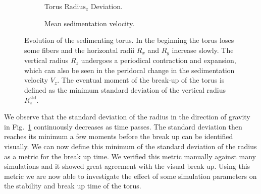 \begin{figure}[!htbp]
\begin{subfigure}[h]{.48\textwidth}
    \caption{Torus $\text{Radius}_z$ Deviation.}\label{fig:torus_deviation}
  \end{subfigure}
  \begin{subfigure}[h]{.48\textwidth}
    \caption{Mean sedimentation velocity.}\label{fig:torus_velocity}
  \end{subfigure}
  \caption[Evolution of the sedimenting torus.]{Evolution of the sedimenting torus. In the beginning the torus loses some fibers and the horizontal radii $R_x$ and $R_y$ increase slowly. The vertical radius $R_z$ undergoes a periodical contraction and expansion, which can also be seen in the peridocal change in the sedimentation velocity $V_z$. The eventual moment of the break-up of the torus is defined as the minimum standard deviation of the vertical radius $R_z^{\text{std}}$.}
  \label{fig:torus}
\end{figure}

We observe that the standard deviation of the radius in the direction of gravity in Fig.~\ref{fig:torus_deviation} continuously decreases as time passes. The standard deviation then reaches its minimum a few moments before the break up can be identified visually. We can now define this minimum of the standard deviation of the radius as a metric for the break up time. We verified this metric manually against many simulations and it showed great agreement with the visual break up. Using this metric we are now able to investigate the effect of some simulation parameters on the stability and break up time of the torus.

